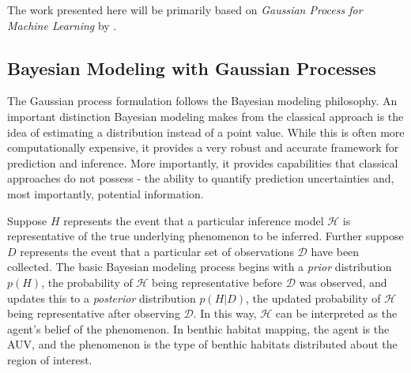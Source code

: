 		

		The work presented here will be primarily based on \textit{Gaussian Process for Machine Learning} by \cite{GaussianProcessForMachineLearning}. 

		\subsection{Bayesian Modeling with Gaussian Processes}
		\label{Background:GaussianProcesses:BayesianModeling}
		
			The Gaussian process formulation follows the Bayesian modeling philosophy. An important distinction Bayesian modeling makes from the classical approach is the idea of estimating a distribution instead of a point value. While this is often more computationally expensive, it provides a very robust and accurate framework for prediction and inference. More importantly, it provides capabilities that classical approaches do not possess - the ability to quantify prediction uncertainties and, most importantly, potential information. 
			
			Suppose $H$ represents the event that a particular inference model $\mathcal{H}$ is representative of the true underlying phenomenon to be inferred. Further suppose $D$ represents the event that a particular set of observations $\mathcal{D}$ have been collected. The basic Bayesian modeling process begins with a \textit{prior} distribution $p(H)$, the probability of $\mathcal{H}$ being representative before $\mathcal{D}$ was observed, and updates this to a \textit{posterior} distribution $p(H | D)$, the updated probability of $\mathcal{H}$ being representative after observing $\mathcal{D}$. In this way, $\mathcal{H}$ can be interpreted as the agent's belief of the phenomenon. In benthic habitat mapping, the agent is the AUV, and the phenomenon is the type of benthic habitats distributed about the region of interest.
			

